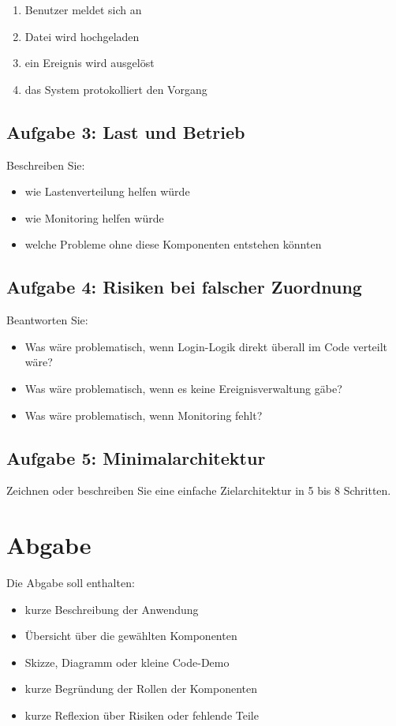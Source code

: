 \documentclass[a4paper,12pt]{article}
\begin{document}
\begin{enumerate}
\item Benutzer meldet sich an
\item Datei wird hochgeladen
\item ein Ereignis wird ausgelöst
\item das System protokolliert den Vorgang
\end{enumerate}

\subsection*{Aufgabe 3: Last und Betrieb}
Beschreiben Sie:
\begin{itemize}
\item wie Lastenverteilung helfen würde
\item wie Monitoring helfen würde
\item welche Probleme ohne diese Komponenten entstehen könnten
\end{itemize}

\subsection*{Aufgabe 4: Risiken bei falscher Zuordnung}
Beantworten Sie:
\begin{itemize}
\item Was wäre problematisch, wenn Login-Logik direkt überall im Code verteilt wäre?
\item Was wäre problematisch, wenn es keine Ereignisverwaltung gäbe?
\item Was wäre problematisch, wenn Monitoring fehlt?
\end{itemize}

\subsection*{Aufgabe 5: Minimalarchitektur}
Zeichnen oder beschreiben Sie eine einfache Zielarchitektur in 5 bis 8 Schritten.

\section*{Abgabe}

Die Abgabe soll enthalten:

\begin{itemize}
\item kurze Beschreibung der Anwendung
\item Übersicht über die gewählten Komponenten
\item Skizze, Diagramm oder kleine Code-Demo
\item kurze Begründung der Rollen der Komponenten
\item kurze Reflexion über Risiken oder fehlende Teile
\end{itemize}
\end{document}
